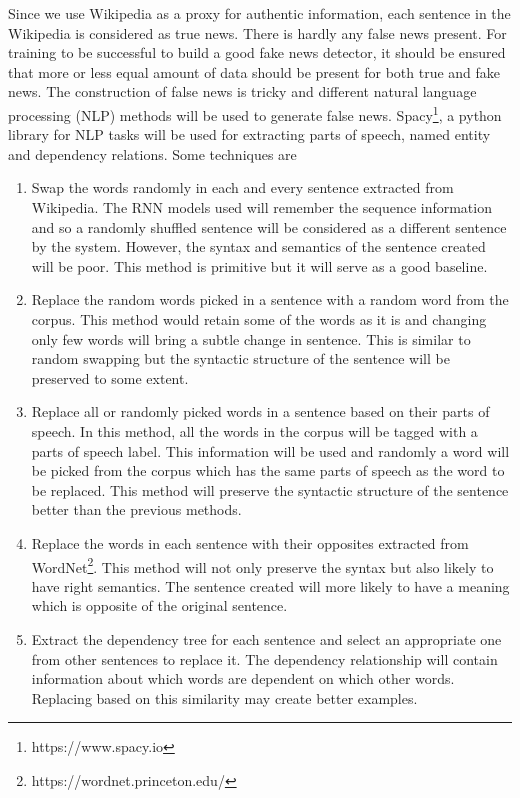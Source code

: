 \documentclass[a4paper, 11pt]{article}
\begin{document}
Since we use Wikipedia as a proxy for authentic information, each sentence in the Wikipedia is considered as true news. There is hardly any false news present. For training to be successful to build a good fake news detector, it should be ensured that more or less equal amount of data should be present for both true and fake news. The construction of false news is tricky and different natural language processing (NLP) methods will be used to generate false news. Spacy\footnote{https://www.spacy.io}, a python library for NLP tasks will be used for extracting parts of speech, named entity and dependency relations. Some techniques are 
\begin{enumerate}
\item Swap the words randomly in each and every sentence extracted from Wikipedia. The RNN models used will remember the sequence information and so a randomly shuffled sentence will be considered as a different sentence by the system. However, the syntax and semantics of the sentence created will be poor. This method is primitive but it will serve as a good baseline. 
\item Replace the random words picked in a sentence with a random word from the corpus. This method would retain some of the words as it is and changing only few words will bring a subtle change in sentence. This is similar to random swapping but the syntactic structure of the sentence will be preserved to some extent.
\item Replace all or randomly picked words in a sentence based on their parts of speech. In this method, all the words in the corpus will be tagged with a parts of speech label. This information will be used and randomly a word will be picked from the corpus which has the same parts of speech as the word to be replaced. This method will preserve the syntactic structure of the sentence better than the previous methods. 
\item Replace the words in each sentence with their opposites extracted from WordNet\footnote{https://wordnet.princeton.edu/}. This method will not only preserve the syntax but also likely to have right semantics. The sentence created will more likely to have a meaning which is opposite of the original sentence. 
\item Extract the dependency tree for each sentence and select an appropriate one from other sentences to replace it. The dependency relationship will contain information about which words are dependent on which other words. Replacing based on this similarity may create better examples.
\end{enumerate}
\end{document}
